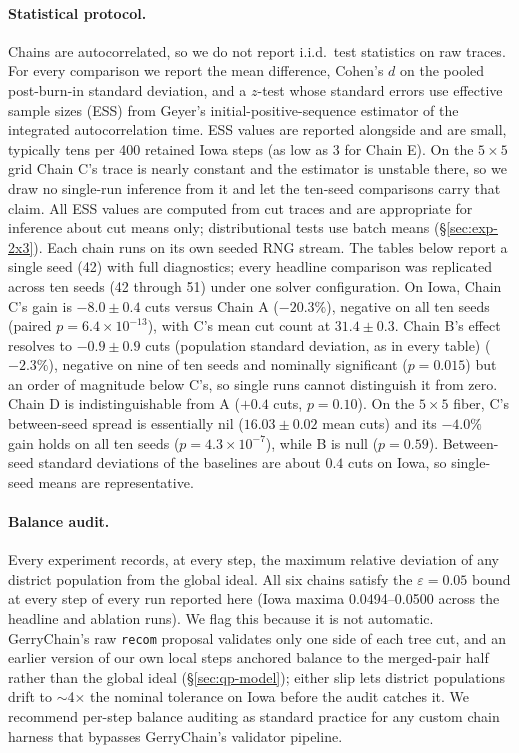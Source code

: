 \documentclass[11pt]{article}
\begin{document}
\paragraph{Statistical protocol.} Chains are autocorrelated, so we do
not report i.i.d.\ test statistics on raw traces. For every
comparison we report the mean difference, Cohen's $d$ on the pooled
post-burn-in standard deviation, and a $z$-test whose standard errors
use effective sample sizes (ESS) from Geyer's initial-positive-sequence
estimator of the integrated autocorrelation time. ESS values are
reported alongside and are small, typically tens per 400 retained
Iowa steps (as low as 3 for Chain E). On the $5 \times 5$ grid Chain
C's trace is nearly constant and the estimator is unstable there, so
we draw no single-run inference from it and let the ten-seed
comparisons carry that claim. All ESS values are computed from cut
traces and are appropriate for inference about cut means only;
distributional tests use batch means (\S\ref{sec:exp-2x3}).
Each chain runs on its own seeded RNG stream. The tables below report
a single seed (42) with full diagnostics; every headline comparison
was replicated across ten seeds (42 through 51) under one solver
configuration. On Iowa, Chain C's gain is $-8.0 \pm 0.4$ cuts versus
Chain A ($-20.3\%$), negative on all ten seeds (paired
$p = 6.4 \times 10^{-13}$), with C's mean cut count at
$31.4 \pm 0.3$. Chain B's effect resolves to $-0.9 \pm 0.9$ cuts (population
standard deviation, as in every table)
($-2.3\%$), negative on nine of ten seeds and nominally significant
($p = 0.015$) but an order of magnitude below C's, so single runs
cannot distinguish it from zero. Chain D is indistinguishable from A
($+0.4$ cuts, $p = 0.10$). On the $5 \times 5$ fiber, C's between-seed
spread is essentially nil ($16.03 \pm 0.02$ mean cuts) and its
$-4.0\%$ gain holds on all ten seeds ($p = 4.3 \times 10^{-7}$),
while B is null ($p = 0.59$). Between-seed standard deviations of the
baselines are about $0.4$ cuts on Iowa, so single-seed means are
representative.

\paragraph{Balance audit.}\label{sec:exp-balance} Every experiment
records, at every step, the maximum relative deviation of any district
population from the global ideal. All six chains satisfy the
$\varepsilon = 0.05$ bound at every step of every run reported here
(Iowa maxima 0.0494--0.0500 across the headline and ablation runs). We flag this because it is not automatic.
GerryChain's raw \texttt{recom} proposal validates only one side of
each tree cut, and an earlier version of our own local steps anchored
balance to the merged-pair half rather than the global ideal
(\S\ref{sec:qp-model}); either slip lets district populations drift
to $\sim$4$\times$ the nominal tolerance on Iowa before the audit
catches it. We recommend per-step balance auditing as standard
practice for any custom chain harness that bypasses GerryChain's
validator pipeline.
\end{document}
